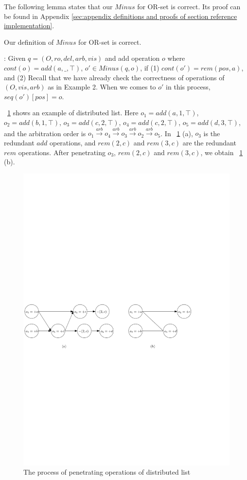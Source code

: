 The following lemma states that our $Minus$ for OR-set is correct. Its proof can be found in Appendix \ref{sec:appendix definitions and proofs of section reference implementation}.

\begin{lemma}
\label{lemma:Minus for OR-set is correct}
Our definition of $Minus$ for OR-set is correct.
\end{lemma}

: Given $q=(O,ro,del,arb,vis)$ and add operation $o$ where $cont(o)=add(a,\_,\top)$, $o' \in Minus(q,o)$, if (1) $cont(o')=rem(pos,a)$, and (2) Recall that we have already check the correctness of operations of $(O,vis,arb)$ as in Example 2. When we comes to $o'$ in this process, $seq(o')[pos]=o$.

\figurename~\ref{fig:the process of penetrate operations in distributed list} shows an example of distributed list. Here $o_1 = add(a,1,\top)$, $o_2 = add(b,1,\top)$, $o_3 = add(c,2,\top)$, $o_4 = add(c,2,\top)$, $o_5 = add(d,3,\top)$, and the arbitration order is $o_1 {\xrightarrow{arb}} o_4 {\xrightarrow{arb}} o_3 {\xrightarrow{arb}} o_2 {\xrightarrow{arb}} o_5$. In \figurename~\ref{fig:the process of penetrate operations in distributed list} (a), $o_3$ is the redundant $add$ operations, and $rem(2,c)$ and $rem(3,c)$ are the redundant $rem$ operations. After penetrating $o_3$, $rem(2,c)$ and $rem(3,c)$, we obtain \figurename~\ref{fig:the process of penetrate operations in distributed list} (b).

\begin{figure}[t]
  \centering
  \includegraphics[width=0.7 \textwidth]{figures/PIC-Example-CompactProcess-list}
  \caption{The process of penetrating operations of distributed list}
  \label{fig:the process of penetrate operations in distributed list}
\end{figure}

